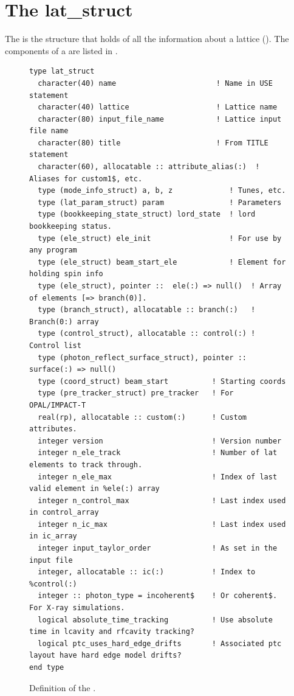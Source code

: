 \chapter{The lat_struct}
\label{c:lat.struct}

The  is the structure that holds of all the information
about a lattice (). The components of a
 are listed in .
\begin{figure}[htb]
\centering
\begin{verbatim}
type lat_struct
  character(40) name                       ! Name in USE statement
  character(40) lattice                    ! Lattice name
  character(80) input_file_name            ! Lattice input file name
  character(80) title                      ! From TITLE statement
  character(60), allocatable :: attribute_alias(:)  ! Aliases for custom1$, etc.
  type (mode_info_struct) a, b, z             ! Tunes, etc.                       
  type (lat_param_struct) param               ! Parameters                        
  type (bookkeeping_state_struct) lord_state  ! lord bookkeeping status.          
  type (ele_struct) ele_init                  ! For use by any program            
  type (ele_struct) beam_start_ele            ! Element for holding spin info     
  type (ele_struct), pointer ::  ele(:) => null()  ! Array of elements [=> branch(0)].
  type (branch_struct), allocatable :: branch(:)   ! Branch(0:) array
  type (control_struct), allocatable :: control(:) ! Control list
  type (photon_reflect_surface_struct), pointer :: surface(:) => null()
  type (coord_struct) beam_start          ! Starting coords
  type (pre_tracker_struct) pre_tracker   ! For OPAL/IMPACT-T
  real(rp), allocatable :: custom(:)      ! Custom attributes.
  integer version                         ! Version number
  integer n_ele_track                     ! Number of lat elements to track through.
  integer n_ele_max                       ! Index of last valid element in %ele(:) array
  integer n_control_max                   ! Last index used in control_array
  integer n_ic_max                        ! Last index used in ic_array
  integer input_taylor_order              ! As set in the input file
  integer, allocatable :: ic(:)           ! Index to %control(:)
  integer :: photon_type = incoherent$    ! Or coherent$. For X-ray simulations.
  logical absolute_time_tracking          ! Use absolute time in lcavity and rfcavity tracking?
  logical ptc_uses_hard_edge_drifts       ! Associated ptc layout have hard edge model drifts?
end type
\end{verbatim}
\caption{Definition of the .}
\label{f:lat.struct}
\end{figure}

